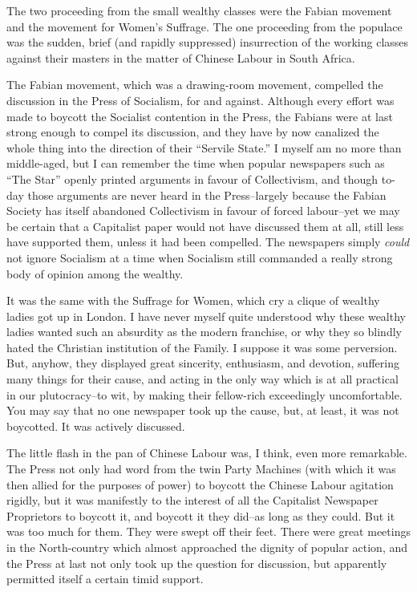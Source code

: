 \documentclass{book}
\begin{document}
The two proceeding from the small wealthy classes were the Fabian movement and the movement for Women’s Suffrage. The one proceeding from the populace was the sudden, brief (and rapidly suppressed) insurrection of the working classes against their masters in the matter of Chinese Labour in South Africa.

The Fabian movement, which was a drawing-room movement, compelled the discussion in the Press of Socialism, for and against. Although every effort was made to boycott the Socialist contention in the Press, the Fabians were at last strong enough to compel its discussion, and they have by now canalized the whole thing into the direction of their “Servile State.” I myself am no more than middle-aged, but I can remember the time when popular newspapers such as “The Star” openly printed arguments in favour of Collectivism, and though to-day those arguments are never heard in the Press–largely because the Fabian Society has itself abandoned Collectivism in favour of forced labour–yet we may be certain that a Capitalist paper would not have discussed them at all, still less have supported them, unless it had been compelled. The newspapers simply \emph{could} not ignore Socialism at a time when Socialism still commanded a really strong body of opinion among the wealthy.

It was the same with the Suffrage for Women, which cry a clique of wealthy ladies got up in London. I have never myself quite understood why these wealthy ladies wanted such an absurdity as the modern franchise, or why they so blindly hated the Christian institution of the Family. I suppose it was some perversion. But, anyhow, they displayed great sincerity, enthusiasm, and devotion, suffering many things for their cause, and acting in the only way which is at all practical in our plutocracy–to wit, by making their fellow-rich exceedingly uncomfortable. You may say that no one newspaper took up the cause, but, at least, it was not boycotted. It was actively discussed.

The little flash in the pan of Chinese Labour was, I think, even more remarkable. The Press not only had word from the twin Party Machines (with which it was then allied for the purposes of power) to boycott the Chinese Labour agitation rigidly, but it was manifestly to the interest of all the Capitalist Newspaper Proprietors to boycott it, and boycott it they did–as long as they could. But it was too much for them. They were swept off their feet. There were great meetings in the North-country which almost approached the dignity of popular action, and the Press at last not only took up the question for discussion, but apparently permitted itself a certain timid support.
\end{document}
